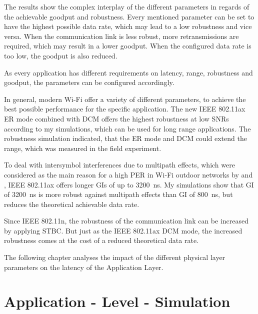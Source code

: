 \documentclass[]{nsm-thesis}
\begin{document}
The results show the complex interplay of the different parameters in regards of the achievable goodput and robustness.
Every mentioned parameter can be set to have the highest possible data rate, which may lead to a low robustness and vice versa.
When the communication link is less robust, more retransmissions are required, which may result in a lower goodput.
When the configured data rate is too low, the goodput is also reduced.

As every application has different requirements on
latency, range, robustness and goodput, the parameters can be configured accordingly.

In general, modern Wi-Fi offer a variety of different parameters, to achieve the best possible performance for the specific application.
The new IEEE 802.11ax \ac{ER} mode combined with \ac{DCM} offers the highest robustness at low \ac{SNR}s according to my simulations, which can
be used for long range applications. The robustness simulation indicated, that the \ac{ER} mode and \ac{DCM} could extend the range, which was measured in the field experiment.

To deal with intersymbol interferences due to multipath effects, which were considered as the main reason for a high \ac{PER} in  Wi-Fi outdoor networks by
\cite{sheth_packet_2007} and \cite{aguayo_link-level_2004}, IEEE 802.11ax offers longer \ac{GI}s of up to \SI{3200}{\nano\second}.
My simulations show that \ac{GI} of \SI{3200}{\nano\second} is more robust against multipath effects than \ac{GI} of \SI{800}{\nano\second}, but
reduces the theoretical achievable data rate.

Since IEEE 802.11n, the robustness of the communication link can be increased by applying \ac{STBC}.
But just as the IEEE 802.11ax \ac{DCM} mode, the
increased robustness comes at the cost of a reduced theoretical data rate.

The following chapter analyses the impact of the different physical layer parameters on the latency of the Application Layer.

\chapter{Application - Level - Simulation}
\end{document}
